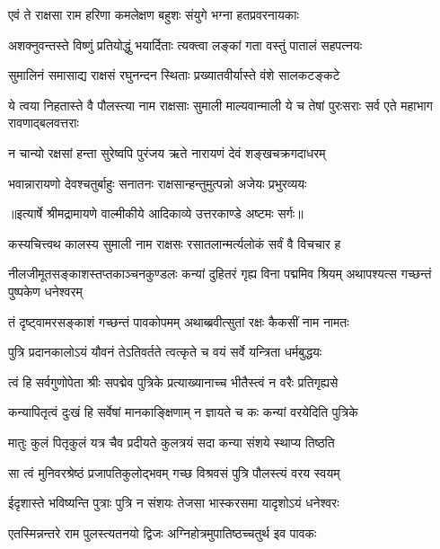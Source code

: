 \twolineshloka
{एवं ते राक्षसा राम हरिणा कमलेक्षण}
{बहुशः संयुगे भग्ना हतप्रवरनायकाः} %

\twolineshloka
{अशक्नुवन्तस्ते विष्णुं प्रतियोद्धुं भयार्दिताः}
{त्यक्त्वा लङ्कां गता वस्तुं पातालं सहपत्नयः} %

\twolineshloka
{सुमालिनं समासाद्य राक्षसं रघुनन्दन}
{स्थिताः प्रख्यातवीर्यास्ते वंशे सालकटङ्कटे} %

\threelineshloka
{ये त्वया निहतास्ते वै पौलस्त्या नाम राक्षसाः}
{सुमाली माल्यवान्माली ये च तेषां पुरःसराः}
{सर्व एते महाभाग रावणाद्बलवत्तराः} %

\twolineshloka
{न चान्यो रक्षसां हन्ता सुरेष्वपि पुरंजय}
{ऋते नारायणं देवं शङ्खचक्रगदाधरम्} %

\twolineshloka
{भवान्नारायणो देवश्चतुर्बाहुः सनातनः}
{राक्षसान्हन्तुमुत्पन्नो अजेयः प्रभुरव्ययः} %


{॥इत्यार्षे श्रीमद्रामायणे वाल्मीकीये आदिकाव्ये उत्तरकाण्डे अष्टमः सर्गः॥}


\twolineshloka
{कस्यचित्त्वथ कालस्य सुमाली नाम राक्षसः}
{रसातलान्मर्त्यलोकं सर्वं वै विचचार ह} %

\threelineshloka
{नीलजीमूतसङ्काशस्तप्तकाञ्चनकुण्डलः}
{कन्यां दुहितरं गृह्य विना पद्ममिव श्रियम्}
{अथापश्यत्स गच्छन्तं पुष्पकेण धनेश्वरम्} %

\twolineshloka
{तं दृष्ट्वामरसङ्काशं गच्छन्तं पावकोपमम्}
{अथाब्ब्रवीत्सुतां रक्षः कैकसीं नाम नामतः} %

\twolineshloka
{पुत्रि प्रदानकालोऽयं यौवनं तेऽतिवर्तते}
{त्वत्कृते च वयं सर्वे यन्त्रिता धर्मबुद्धयः} %

\twolineshloka
{त्वं हि सर्वगुणोपेता श्रीः सपद्मेव पुत्रिके}
{प्रत्याख्यानाच्च भीतैस्त्वं न वरैः प्रतिगृह्यसे} %

\twolineshloka
{कन्यापितृत्वं दुःखं हि सर्वेषां मानकाङ्क्षिणाम्}
{न ज्ञायते च कः कन्यां वरयेदिति पुत्रिके} %

\twolineshloka
{मातुः कुलं पितृकुलं यत्र चैव प्रदीयते}
{कुलत्रयं सदा कन्या संशये स्थाप्य तिष्ठति} %

\twolineshloka
{सा त्वं मुनिवरश्रेष्ठं प्रजापतिकुलोद्भवम्}
{गच्छ विश्रवसं पुत्रि पौलस्त्यं वरय स्वयम्} %

\twolineshloka
{ईदृशास्ते भविष्यन्ति पुत्राः पुत्रि न संशयः}
{तेजसा भास्करसमा यादृशोऽयं धनेश्वरः} %

\twolineshloka
{एतस्मिन्नन्तरे राम पुलस्त्यतनयो द्विजः}
{अग्निहोत्रमुपातिष्ठच्चतुर्थ इव पावकः} %

